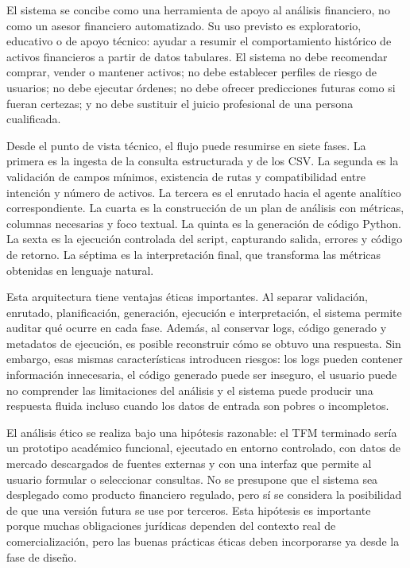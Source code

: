 \documentclass{article}
\begin{document}
El sistema se concibe como una herramienta de apoyo al análisis financiero, no como un asesor financiero automatizado. Su uso previsto es exploratorio, educativo o de apoyo técnico: ayudar a resumir el comportamiento histórico de activos financieros a partir de datos tabulares. El sistema no debe recomendar comprar, vender o mantener activos; no debe establecer perfiles de riesgo de usuarios; no debe ejecutar órdenes; no debe ofrecer predicciones futuras como si fueran certezas; y no debe sustituir el juicio profesional de una persona cualificada.

Desde el punto de vista técnico, el flujo puede resumirse en siete fases. La primera es la ingesta de la consulta estructurada y de los CSV. La segunda es la validación de campos mínimos, existencia de rutas y compatibilidad entre intención y número de activos. La tercera es el enrutado hacia el agente analítico correspondiente. La cuarta es la construcción de un plan de análisis con métricas, columnas necesarias y foco textual. La quinta es la generación de código Python. La sexta es la ejecución controlada del script, capturando salida, errores y código de retorno. La séptima es la interpretación final, que transforma las métricas obtenidas en lenguaje natural.

Esta arquitectura tiene ventajas éticas importantes. Al separar validación, enrutado, planificación, generación, ejecución e interpretación, el sistema permite auditar qué ocurre en cada fase. Además, al conservar logs, código generado y metadatos de ejecución, es posible reconstruir cómo se obtuvo una respuesta. Sin embargo, esas mismas características introducen riesgos: los logs pueden contener información innecesaria, el código generado puede ser inseguro, el usuario puede no comprender las limitaciones del análisis y el sistema puede producir una respuesta fluida incluso cuando los datos de entrada son pobres o incompletos.

El análisis ético se realiza bajo una hipótesis razonable: el TFM terminado sería un prototipo académico funcional, ejecutado en entorno controlado, con datos de mercado descargados de fuentes externas y con una interfaz que permite al usuario formular o seleccionar consultas. No se presupone que el sistema sea desplegado como producto financiero regulado, pero sí se considera la posibilidad de que una versión futura se use por terceros. Esta hipótesis es importante porque muchas obligaciones jurídicas dependen del contexto real de comercialización, pero las buenas prácticas éticas deben incorporarse ya desde la fase de diseño.
\end{document}
